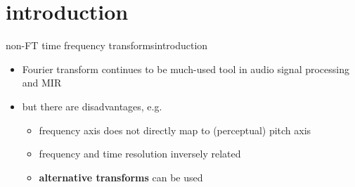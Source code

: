     \section[intro]{introduction}
        \begin{frame}{non-FT time frequency transforms}{introduction}
            \begin{itemize}
                \item   Fourier transform continues to be much-used tool in audio signal processing and MIR
                \bigskip
                \item   but there are disadvantages, e.g.
                    \begin{itemize}
                        \item   frequency axis does not directly map to (perceptual) pitch axis
                        \item   frequency and time resolution inversely related
                        \smallskip
                        \item<2->[$\Rightarrow$] \textbf{alternative transforms} can be used
                    \end{itemize}
            \end{itemize}
        \end{frame}
        
